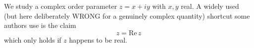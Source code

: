 \documentclass{article}
\begin{document}
We study a complex order parameter $z = x + i y$ with $x,y$ real. A widely
used (but here deliberately WRONG for a genuinely complex quantity)
shortcut some authors use is the claim
\begin{equation}
  z = \mathrm{Re}\, z
  \label{eq:wrongreal}
\end{equation}
which only holds if $z$ happens to be real.
\end{document}
